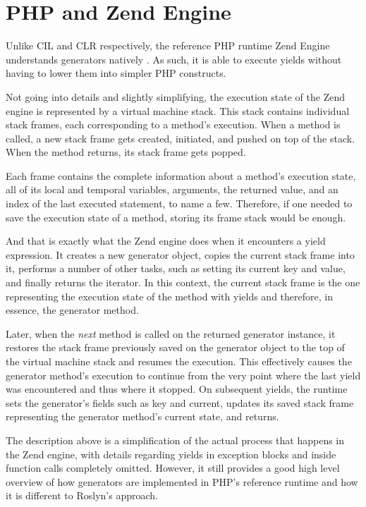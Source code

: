 \section{PHP and Zend Engine}\label{ZendGen}

Unlike CIL and CLR respectively, the reference PHP runtime Zend Engine understands generators natively \citep{ZendGen}. As such, it is able to execute yields without having to lower them into simpler PHP constructs.

Not going into details and slightly simplifying, the execution state of the Zend engine is represented by a virtual machine stack. This stack contains individual stack frames, each corresponding to a method’s execution. When a method is called, a new stack frame gets created, initiated, and pushed on top of the stack. When the method returns, its stack frame gets popped.

Each frame contains the complete information about a method’s execution state, all of its local and temporal variables, arguments, the returned value, and an index of the last executed statement, to name a few. Therefore, if one needed to save the execution state of a method, storing its frame stack would be enough.

And that is exactly what the Zend engine does when it encounters a yield expression. It creates a new generator object, copies the current stack frame into it, performs a number of other tasks, such as setting its current key and value, and finally returns the iterator. In this context, the current stack frame is the one representing the execution state of the method with yields and therefore, in essence, the generator method.

Later, when the \emph{next} method is called on the returned generator instance, it restores the stack frame previously saved on the generator object to the top of the virtual machine stack and resumes the execution. This effectively causes the generator method’s execution to continue from the very point where the last yield was encountered and thus where it stopped. On subsequent yields, the runtime sets the generator’s fields such as key and current, updates its saved stack frame representing the generator method's current state, and returns.

The description above is a simplification of the actual process that happens in the Zend engine, with details regarding yields in exception blocks and inside function calls completely omitted. However, it still provides a good high level overview of how generators are implemented in PHP’s reference runtime and how it is different to Roslyn’s approach.  
